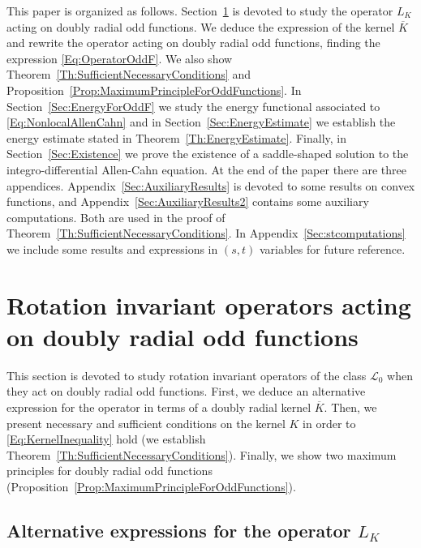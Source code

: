 \documentclass[12pt,reqno]{amsart}
\theoremstyle{definition}
\theoremstyle{remark}
\newcommand{\lcal}{\mathcal{L}}
\numberwithin{equation}{section}
\begin{document}
This paper is organized as follows. Section~\ref{Sec:OperatorOddF} is devoted to study the operator $L_K$ acting on doubly radial odd functions. We deduce the expression of the kernel $\overline{K}$ and rewrite the operator acting on doubly radial odd functions, finding the expression \eqref{Eq:OperatorOddF}. We also show Theorem~\ref{Th:SufficientNecessaryConditions} and Proposition~\ref{Prop:MaximumPrincipleForOddFunctions}. In Section~\ref{Sec:EnergyForOddF} we study the energy functional associated to \eqref{Eq:NonlocalAllenCahn} and in Section~\ref{Sec:EnergyEstimate} we establish the energy estimate stated in Theorem~\ref{Th:EnergyEstimate}. Finally, in Section~\ref{Sec:Existence} we prove the existence of a saddle-shaped solution to the integro-differential Allen-Cahn equation. At the end of the paper there are three appendices. Appendix~\ref{Sec:AuxiliaryResults} is devoted to some results on convex functions, and Appendix~\ref{Sec:AuxiliaryResults2} contains some auxiliary computations. Both are used in the proof of Theorem~\ref{Th:SufficientNecessaryConditions}. In Appendix~\ref{Sec:stcomputations} we include some results and expressions in $(s,t)$ variables for future reference.



\section{Rotation invariant operators acting on doubly radial odd functions}
\label{Sec:OperatorOddF}

This section is devoted to study rotation invariant operators of the class $\lcal_0$ when they act on doubly radial odd functions. First, we deduce an alternative expression for the operator in terms of a doubly radial kernel $\overline{K}$. Then, we present necessary and sufficient conditions on the kernel $K$ in order to \eqref{Eq:KernelInequality} hold (we establish Theorem~\ref{Th:SufficientNecessaryConditions}). Finally, we show two maximum principles for doubly radial odd functions (Proposition~\ref{Prop:MaximumPrincipleForOddFunctions}).


\subsection{Alternative expressions for the operator $L_K$}
\end{document}
